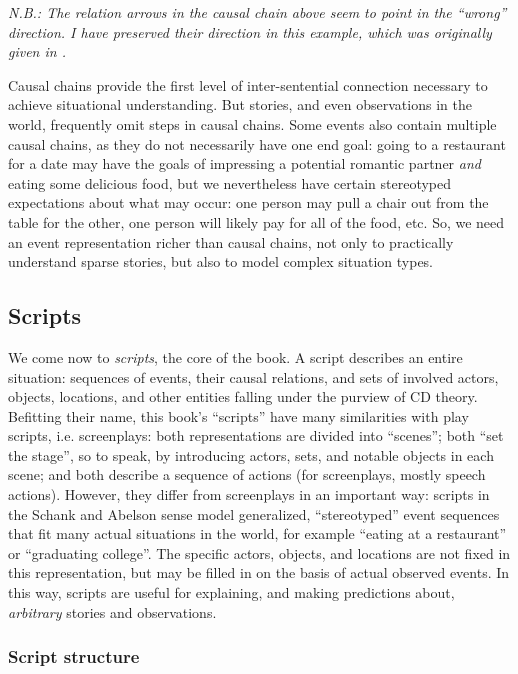 \textit{N.B.: The relation arrows in the causal chain above seem to point in the ``wrong'' direction. I have preserved their direction in this example, which was originally given in \citep{schankandabelson}.}

Causal chains provide the first level of inter-sentential connection necessary to achieve situational understanding. But stories, and even observations in the world, frequently omit steps in causal chains. Some events also contain multiple causal chains, as they do not necessarily have one end goal: going to a restaurant for a date may have the goals of impressing a potential romantic partner \textit{and} eating some delicious food, but we nevertheless have certain stereotyped expectations about what may occur: one person may pull a chair out from the table for the other, one person will likely pay for all of the food, etc. So, we need an event representation richer than causal chains, not only to practically understand sparse stories, but also to model complex situation types.
\fi

\subsection{Scripts}
We come now to \textit{scripts}, the core of the book. A script describes an entire situation: sequences of events, their causal relations, and sets of involved actors, objects, locations, and other entities falling under the purview of CD theory. Befitting their name, this book's ``scripts'' have many similarities with play scripts, i.e. screenplays: both representations are divided into ``scenes''; both ``set the stage'', so to speak, by introducing actors, sets, and notable objects in each scene; and both describe a sequence of actions (for screenplays, mostly speech actions). However, they differ from screenplays in an important way: scripts in the Schank and Abelson sense model generalized, ``stereotyped'' event sequences that fit many actual situations in the world, for example ``eating at a restaurant'' or ``graduating college''. The specific actors, objects, and locations are not fixed in this representation, but may be filled in on the basis of actual observed events. In this way, scripts are useful for explaining, and making predictions about, \textit{arbitrary} stories and observations.

\subsubsection{Script structure}

